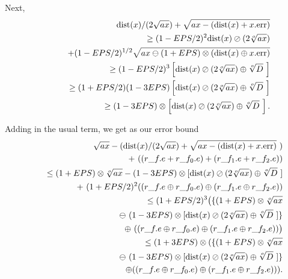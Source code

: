 Next,
\begin{eqnarray*}
&&{\rm dist}(x)/(2 \sqrt {ax}) + \sqrt {ax - ({\rm dist}(x) + x.{\rm err})}\\
&&\quad 
\ge  (1 - EPS/2)^2 {\rm dist}(x) \oslash (2 \root o \of {ax}) 
\\
&&\qquad + (1 - EPS/2)^{1/2}\sqrt {ax \ominus (1+EPS) \otimes ({\rm dist}(x) \oplus x.{\rm err})}
                                              \\
&&\quad \ge(1 - EPS/2)^3 \left[{\rm dist}(x) \oslash (2 \root o \of {ax}) \oplus \root o \of {D}\
\right]\\
&&\quad \ge (1 + EPS/2) (1 - 3EPS) \left[{\rm dist}(x) \oslash (2 \root o \of {ax}) \oplus \root o \of {D}\ \right]\\
&&\quad \ge (1 -
3EPS) \otimes \left[{\rm dist}(x) \oslash (2 \root o \of {ax}) \oplus \root o \of {D}\ \right].
\end{eqnarray*}

Adding in the usual term, we get as our error bound
\begin{eqnarray*}
&&\sqrt {ax} - ({\rm dist}(x)/(2 \sqrt {ax}) + \sqrt {ax - ({\rm dist}(x) + x.{\rm err})}\ )\\
&&\qquad+\ ((r\_f.e + r\_f_0.e) + (r\_f_1.e + r\_f_2.e))\\
&&\quad \le (1 + EPS) \otimes \root o \of {ax} 
- (1 - 3EPS) \otimes [{\rm dist}(x) \oslash (2 \root o \of {ax}) \oplus 
\root o \of {D}\ ]
\\
&&\qquad+\ (1 + EPS/2)^2 ((r\_f.e \oplus r\_f_0.e) \oplus (r\_f_1.e \oplus r\_f_2.e))
      \\
&&\quad \le (1 + EPS/2)^3 \big(\{(1 + EPS) \otimes \root o \of {ax} \\
&&\qquad 
\ominus\ (1 - 3EPS) \otimes [{\rm dist}(x) \oslash (2 \root o \of {ax}) \oplus \root o \of {D}\ ]\}
\\
&&\qquad \oplus\ ((r\_f.e \oplus r\_f_0.e) \oplus (r\_f_1.e \oplus r\_f_2.e))\big)
 \\
&&\quad \le (1 + 3EPS) \otimes (
\{(1 + EPS) \otimes \root o \of {ax} 
\\
&&\qquad\ominus\ (1 - 3EPS) \otimes [{\rm dist}(x) \oslash (2 \root o \of {ax})\oplus \root o \of {D}\ ]\}
\\
&&\qquad \oplus ((r\_f.e \oplus r\_f_0.e) \oplus (r\_f_1.e \oplus r\_f_2.e))
                                                ).\\
\noalign{\vskip-36pt}
\end{eqnarray*}
\enddemo



